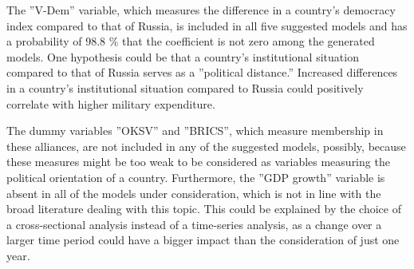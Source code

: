 \documentclass[12pt,a4paper]{article}
\begin{document}
The ''V-Dem'' variable, which measures the difference in a country's democracy index compared to that of Russia, is included in all five suggested models and has a probability of 98.8 \% that the coefficient is not zero among the generated models. One hypothesis could be that a country's institutional situation compared to that of Russia serves as a ''political distance.'' Increased differences in a country's institutional situation compared to Russia could positively correlate with higher military expenditure.

The dummy variables ''OKSV'' and ''BRICS'', which measure membership in these alliances, are not included in any of the suggested models, possibly, because these measures might be too weak to be considered as variables measuring the political orientation of a country. Furthermore, the ''GDP growth'' variable is absent in all of the models under consideration, which is not in line with the broad literature dealing with this topic. This could be explained by the choice of a cross-sectional analysis instead of a time-series analysis, as a change over a larger time period could have a bigger impact than the consideration of just one year.  
\end{document}
